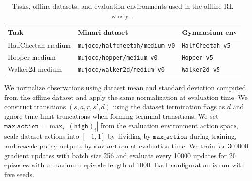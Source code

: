 \documentclass{article}
\theoremstyle{plain}
\theoremstyle{definition}
\theoremstyle{remark}
\begin{document}
\begin{table}
\centering
\caption{Tasks, offline datasets, and evaluation environments used in the offline RL study \cite{todorov2012mujoco,minari,gymnasium}.}
\label{tab:offline_rl_tasks}
\footnotesize
\begin{tabular}{@{}p{}p{}p{}@{}}
\toprule
Task & Minari dataset & Gymnasium env \\
\midrule
HalfCheetah-medium & \texttt{mujoco/halfcheetah/medium-v0} & \texttt{HalfCheetah-v5} \\
Hopper-medium      & \texttt{mujoco/hopper/medium-v0}      & \texttt{Hopper-v5} \\
Walker2d-medium    & \texttt{mujoco/walker2d/medium-v0}    & \texttt{Walker2d-v5} \\
\bottomrule
\end{tabular}
\end{table}

We normalize observations using dataset mean and standard deviation computed from the offline dataset and apply the same normalization at evaluation time. We construct transitions $(s,a,r,s',d)$ using the dataset termination flags as $d$ and ignore time-limit truncations when forming terminal transitions. We set $\texttt{max\_action}=\max_i|(\texttt{high})_i|$ from the evaluation environment action space, scale dataset actions into $[-1,1]$ by dividing by $\texttt{max\_action}$ during training, and rescale policy outputs by $\texttt{max\_action}$ at evaluation time. We train for \num{300000} gradient updates with batch size 256 and evaluate every \num{10000} updates for 20 episodes with a maximum episode length of 1000. Each configuration is run with five seeds.
\end{document}

